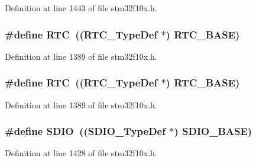 Definition at line 1443 of file stm32f10x.\+h.

\subsubsection[{\texorpdfstring{R\+TC}{RTC}}]{\setlength{\rightskip}{0pt plus 5cm}\#define R\+TC~(({\bf R\+T\+C\+\_\+\+Type\+Def} $\ast$) {\bf R\+T\+C\+\_\+\+B\+A\+SE})}\hypertarget{group___peripheral__declaration_ga5359a088f5d8b20ce74d920e46059304}{}\label{group___peripheral__declaration_ga5359a088f5d8b20ce74d920e46059304}


Definition at line 1389 of file stm32f10x.\+h.

\subsubsection[{\texorpdfstring{R\+TC}{RTC}}]{\setlength{\rightskip}{0pt plus 5cm}\#define R\+TC~(({\bf R\+T\+C\+\_\+\+Type\+Def} $\ast$) {\bf R\+T\+C\+\_\+\+B\+A\+SE})}\hypertarget{group___peripheral__declaration_ga5359a088f5d8b20ce74d920e46059304}{}\label{group___peripheral__declaration_ga5359a088f5d8b20ce74d920e46059304}


Definition at line 1389 of file stm32f10x.\+h.

\subsubsection[{\texorpdfstring{S\+D\+IO}{SDIO}}]{\setlength{\rightskip}{0pt plus 5cm}\#define S\+D\+IO~(({\bf S\+D\+I\+O\+\_\+\+Type\+Def} $\ast$) {\bf S\+D\+I\+O\+\_\+\+B\+A\+SE})}\hypertarget{group___peripheral__declaration_ga8149aa2760fffac16bc75216d5fd9331}{}\label{group___peripheral__declaration_ga8149aa2760fffac16bc75216d5fd9331}


Definition at line 1428 of file stm32f10x.\+h.

